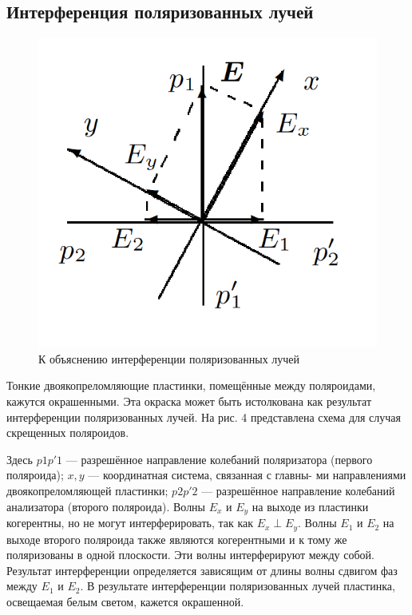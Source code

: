 \documentclass[12pt]{kiarticle}
\begin{document}
\subsection{Интерференция поляризованных лучей}

\begin{figure}
	\includegraphics[width=\linewidth]{4}
	\caption{К объяснению интерференции
поляризованных лучей}
	\label{ris 4}
\end{figure}


Тонкие двоякопреломляющие пластинки, помещённые между поляроидами, кажутся окрашенными. Эта окраска может быть истолкована как результат интерференции поляризованных лучей. На рис. 4 представлена схема для
случая скрещенных поляроидов.

Здесь $ p1p'1 $ --- разрешённое направление колебаний поляризатора
(первого поляроида); $ x, y $ --- координатная система, связанная с главны-
ми направлениями двоякопреломляющей пластинки; $ p2p'2 $ --- разрешённое направление колебаний анализатора (второго поляроида). Волны
$ E_x  $ и $ E_y $ на выходе из пластинки когерентны, но не могут интерферировать, так как $ E_x \perp  E_y $. Волны $ E_1 $ и $ E_2 $ на выходе второго поляроида
также являются когерентными и к тому же поляризованы в одной плоскости. Эти волны интерферируют между собой. Результат интерференции определяется зависящим от длины волны сдвигом фаз между $ E_1 $
и $ E_2 $. В результате интерференции поляризованных лучей пластинка, освещаемая белым светом, кажется окрашенной.
\end{document}
